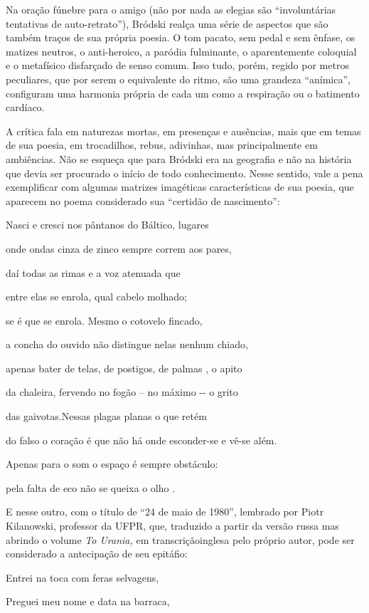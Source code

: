 Na oração fúnebre para o amigo (não por nada as elegias são
``involuntárias tentativas de auto-retrato''), Bródski realça uma série
de aspectos que são também traços de sua própria poesia. O tom pacato,
sem pedal e sem ênfase, os matizes neutros, o anti-heroico, a paródia
fulminante, o aparentemente coloquial e o metafísico disfarçado de senso
comum. Isso tudo, porém, regido por metros peculiares, que por serem o
equivalente do ritmo, são uma grandeza ``anímica'', configuram uma
harmonia própria de cada um como a respiração ou o batimento cardíaco.

A crítica fala em naturezas mortas, em presenças e ausências, mais que
em temas de sua poesia, em trocadilhos, rebus, adivinhas, mas
principalmente em ambiências. Não se esqueça que para Bródski era na
geografia e não na história que devia ser procurado o início de todo
conhecimento. Nesse sentido, vale a pena exemplificar com algumas
matrizes imagéticas características de sua poesia, que aparecem no poema
considerado sua ``certidão de nascimento'':

Nasci e cresci nos pântanos do Báltico, lugares

onde ondas cinza de zinco sempre correm aos pares,

daí todas as rimas e a voz atenuada que

entre elas se enrola, qual cabelo molhado;

se é que se enrola. Mesmo o cotovelo fincado,

a concha do ouvido não distingue nelas nenhum chiado,

apenas bater de telas, de postigos, de palmas , o apito

da chaleira, fervendo no fogão -- no máximo -\/- o grito

das gaivotas.Nessas plagas planas o que retém

do falso o coração é que não há onde esconder-se e vê-se além.

Apenas para o som o espaço é sempre obstáculo:

pela falta de eco não se queixa o olho .

E nesse outro, com o título de ``24 de maio de 1980'', lembrado por
Piotr Kilanowski, professor da UFPR, que, traduzido a partir da versão
russa mas abrindo o volume \emph{To Urania,} em transcriçãoinglesa pelo
próprio autor, pode ser considerado a antecipação de seu epitáfio:

Entrei na toca com feras selvagens,

Preguei meu nome e data na barraca,

